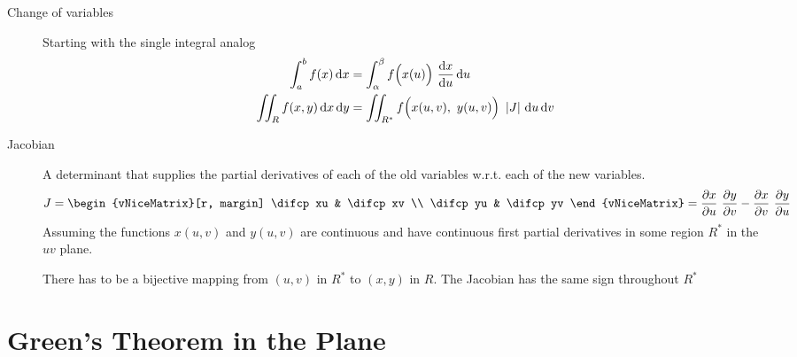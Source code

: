 \begin{description}
    \item[Change of variables] Starting with the single integral analog
        \begin{align}
            \int_{a}^{b}f(x) \dl x      & = \int_{\alpha}^{\beta}
            f\Big(x(u)\Big)\ \diff xu \dl u                       \\
            \iint_R f(x, y) \dl x \dl y & =
            \iint_{R^*} f\Big(x(u, v),\ y(u, v)\Big)\ \abs{J} \dl u \dl v
        \end{align}

    \item[Jacobian] A determinant that supplies the partial derivatives of each of the
        old variables w.r.t. each of the new variables.
        \begin{align}
            J & = \begin{vNiceMatrix}[r, margin]
                      \difcp xu & \difcp xv \\ \difcp yu & \difcp yv
                  \end{vNiceMatrix} =
            \diffp xu \ \diffp yv - \diffp xv \ \diffp yu
        \end{align}
        Assuming the functions $ x(u, v) $ and $ y(u, v) $ are continuous and have
        continuous first partial derivatives in some region $ R^* $ in the $ uv $ plane.

        \par There has to be a bijective mapping from $ (u, v) $ in $ R^* $ to $ (x, y) $
        in $ R $. The Jacobian has the same sign throughout $ R^* $

\end{description}

\section{Green's Theorem in the Plane}


